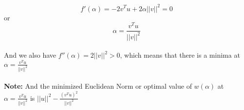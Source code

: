 \documentclass[prl,twocolumn,showpacs,preprintnumbers,superscriptaddress]{revtex4}
\theoremstyle{plain}
\theoremstyle{definition}
\begin{document}
\begin{widetext}
\begin{equation}
    f'(\alpha) = - 2 v^Tu + 2\alpha||v||^2 = 0
\end{equation}
or
\begin{equation}
    \alpha = \frac {v^Tu}{||v||^2}
\end{equation}
\\
And we also have $f''(\alpha) = 2||v||^2 > 0$, which means that there is a minima at $\alpha = \frac {v^Tu}{||v||^2}$
\\
\\
\textbf{Note:} And the minimized Euclidean Norm or optimal value of $w(\alpha)$ at $\alpha = \frac {v^Tu}{||v||^2}$ is $||u||^2 - \frac{(v^Tu)^2}{||v||^2}$
\\
\\
\\
\end{widetext}
\end{document}
